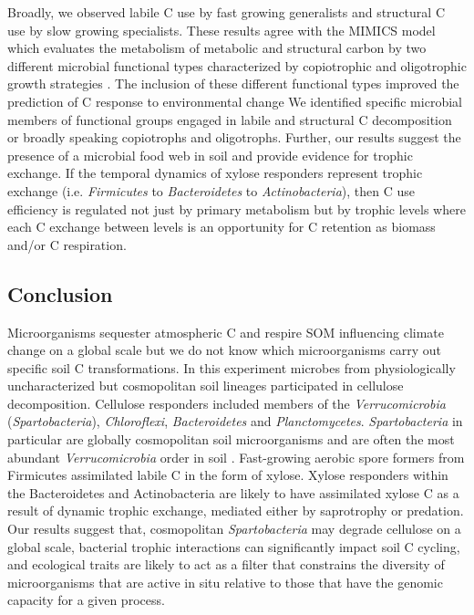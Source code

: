 Broadly, we observed labile C use by fast growing generalists and structural
C use by slow growing specialists. These results agree with the MIMICS model
which evaluates the metabolism of metabolic and structural carbon by two
different microbial functional types characterized by copiotrophic and
oligotrophic growth strategies \citep{wieder_2014a}. 
The inclusion of these different functional types improved the
prediction of C response to environmental change 
We identified specific microbial members of functional groups engaged in labile
and structural C decomposition or broadly speaking copiotrophs and oligotrophs.
Further, our results suggest the presence of a microbial food web in soil and
provide evidence for  trophic exchange. If the temporal dynamics of xylose
responders represent trophic exchange (i.e. \textit{Firmicutes} to
\textit{Bacteroidetes} to \textit{Actinobacteria}), then C use efficiency is
regulated not just by primary metabolism but by trophic levels where each
C exchange between levels is an opportunity for C retention as biomass and/or
C respiration. 

\subsection{Conclusion} 
Microorganisms sequester atmospheric C and respire SOM influencing climate
change on a global scale but we do not know which microorganisms carry out
specific soil C transformations. In this experiment microbes from
physiologically uncharacterized but cosmopolitan soil lineages participated in
cellulose decomposition. Cellulose responders included members of the
\textit{Verrucomicrobia} (\textit{Spartobacteria}), \textit{Chloroflexi},
\textit{Bacteroidetes} and \textit{Planctomycetes}. \textit{Spartobacteria} in
particular are globally cosmopolitan soil microorganisms and are often the most
abundant \textit{Verrucomicrobia} order in soil \citep{Bergmann_2011}.
Fast-growing aerobic spore formers from Firmicutes assimilated labile C in the
form of xylose. Xylose responders within the Bacteroidetes and Actinobacteria
are likely to have assimilated xylose C as a result of dynamic trophic
exchange, mediated either by saprotrophy or predation. Our results suggest
that, cosmopolitan \textit{Spartobacteria} may degrade cellulose on a global
scale, bacterial trophic interactions can significantly impact soil C cycling,
and ecological traits are likely to act as a filter that constrains the
diversity of microorganisms that are active in situ relative to those that have
the genomic capacity for a given process.
